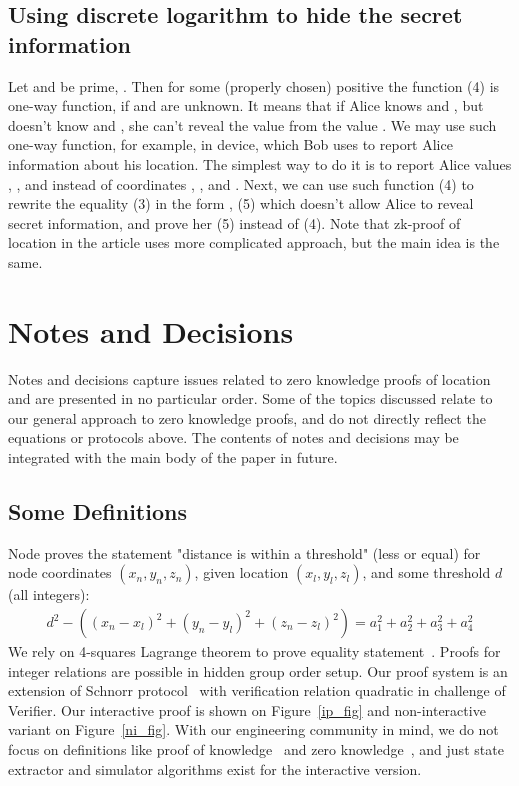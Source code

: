 \documentclass{article}
\begin{document}
\subsection{Using discrete logarithm to hide the secret information}  %
Let      and      be prime,     . Then for some (properly chosen) positive      the function
                                                            (4)
is one-way function, if      and      are unknown.
It means that if Alice knows      and     , but doesn’t know      and     ,
she can’t reveal the value      from the value     .
We may use such one-way function, for example, in device, which Bob uses to report Alice information about his location.
The simplest way to do it is to report Alice values     ,     , and      instead of coordinates     ,
   , and     .
Next, we can use such function (4) to rewrite the equality (3) in the form
    ,                                    (5)
which doesn’t allow Alice to reveal secret information, and prove her (5) instead of (4).
Note that zk-proof of location in the article uses more complicated approach, but the main idea is the same.


\section{Notes and Decisions}

Notes and decisions capture issues related to zero knowledge proofs of location and are presented in no particular order.
Some of the topics discussed relate to our general approach to zero knowledge proofs, and do not directly reflect the equations or protocols above.
The contents of notes and decisions may be integrated with the main body of the paper in future. 


\subsection{Some Definitions}
\label{sect-definitions}
Node proves the statement "distance is within a threshold" (less or equal)
for node coordinates $(x_n, y_n, z_n)$,
given location $(x_l, y_l, z_l)$,
and some threshold $d$ (all integers):
\begin{gather}
\label{eq-distn-cp}
  d^2 - ((x_n - x_l)^2 + (y_n - y_l)^2 + (z_n - z_l)^2) = a_1^2 + a_2^2 + a_3^2 + a_4^2
\end{gather}
We rely on 4-squares Lagrange theorem to prove equality statement~\cite{Lipmaa03}.
Proofs for integer relations are possible in hidden group order setup.
Our proof system is an extension of Schnorr protocol~\cite{Schnorr91}
with verification relation quadratic in challenge of Verifier.
Our interactive proof is shown on Figure~\ref{ip_fig}
and non-interactive variant on Figure~\ref{ni_fig}.
With our engineering community in mind, we do not focus on definitions like
proof of knowledge~\cite{BellarePoK}
and zero knowledge~\cite{Goldwasser85,GMW},
and just state extractor and simulator algorithms exist for the interactive version.
\end{document}
